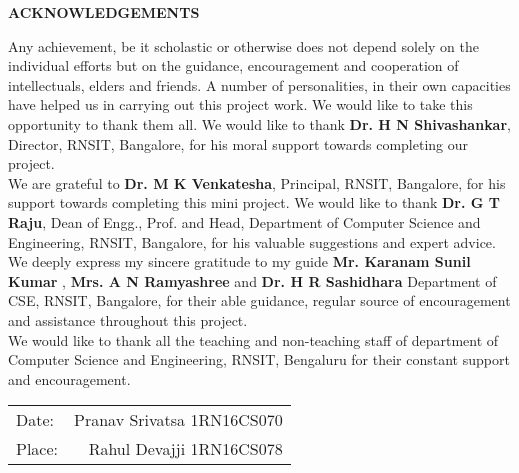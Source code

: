 \thispagestyle{empty}
\begin{center}
\textup{\large{\textbf{ACKNOWLEDGEMENTS}}} \\[0.1in]
\end{center}
\justify
\indent
Any achievement, be it scholastic or otherwise does not depend solely on the individual efforts but on the guidance, encouragement and cooperation of intellectuals, elders and friends. A number of personalities, in their own capacities have helped us in carrying out this project work. We would like to take this opportunity to thank them all.
We would like to thank \textbf{Dr. H N Shivashankar}, Director, RNSIT, Bangalore, for his moral support towards completing our project.\\
We are grateful to \textbf{Dr. M K Venkatesha}, Principal, RNSIT, Bangalore, for his support towards completing this mini project.
We would like to thank \textbf{Dr. G T Raju}, Dean of Engg., Prof. and Head, Department of Computer Science and Engineering, RNSIT, Bangalore, for his valuable suggestions and expert advice.
We deeply express my sincere gratitude to my guide \textbf{Mr. Karanam Sunil Kumar} , \textbf{Mrs. A N Ramyashree} and \textbf{Dr. H R Sashidhara} Department of CSE, RNSIT, Bangalore, for their able guidance, regular source of encouragement and assistance throughout this project.\\
We would like to thank all the teaching and non-teaching staff of department of Computer Science and Engineering, RNSIT, Bengaluru for their constant support and encouragement.\\[2in]
\justify
\begin{tabular}{l r}
\textup{Date:} & \hspace{9cm}\textup{Pranav Srivatsa 1RN16CS070}\\
\textup{Place:} & \hspace{9cm}\textup{Rahul Devajji 1RN16CS078}
\end{tabular}


\pagebreak
